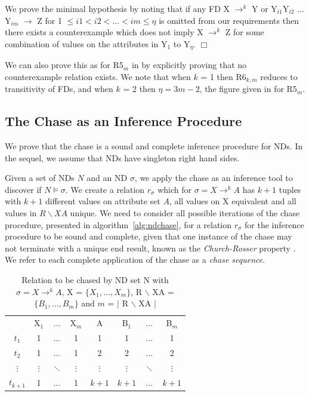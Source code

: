 We prove the minimal hypothesis by noting that if any FD X $\to^k$ Y
or \linebreak Y$_{i1}$Y$_{i2}$ $\ldots$
Y$_{im}$ $\to$ Z for 1 $\le i1 < i2 < \ldots < im \le \eta$ is
omitted from our requirements then there exists a counterexample which
does not imply X $\to^k$ Z for some combination of values on the
attributes in Y$_1$ to Y$_{\eta}$. $\Box$

\smallskip

We can also prove this as for R5$_m$ in \cite{gm85b} by explicitly
proving that no counterexample relation exists.
We note that when $k$ = 1 then R6$_{k,m}$ reduces to transitivity of FDs,
and when $k$ = 2 then $\eta = 3m - 2$, the figure given in
\cite{gm85b} for R5$_m$. 


\subsection{The Chase as an Inference Procedure}\label{subsec:nd_ch_inf}

We prove that the chase is a 
sound and complete inference procedure for NDs. In the sequel, we
assume that NDs have singleton right hand sides.

Given a set of NDs $N$ and an ND $\sigma$, we apply the chase as an
inference tool to discover if $N \models \sigma$. 
We create a relation $r_\sigma$ which for $\sigma = X \to^k
A$ has $k+1$ tuples with $k+1$ different values on attribute set $A$,
all values on X equivalent and all values in $R \backslash XA$ unique.
We need to consider all possible iterations of the chase procedure,
presented in algorithm~\ref{alg:ndchase}, for a relation $r_\sigma$
for the inference procedure to be sound and complete, given that one
instance of the chase may not terminate with a unique end result,
known as the {\em Church-Rosser} property \cite{mms79}. We refer to
each complete application of the chase as a {\em chase sequence}.

{\line
\begin{table}[ht]
\begin{center}
\begin{tabular}{c|c|c|c|c|c|c|c|} \cline{2-8}
 		& X$_1$ 	& $\ldots$ 	& X$_m$ & A 	& B$_1$ & $\ldots$ 	& B$_m$ \\ \cline{2-8}
$t_1$ 		& 1  		& $\ldots$ 	& 1	&  1  	& 1 	& $\ldots$ 	& 1 \\
$t_2$ 		& 1  	& $\ldots$ 	& 1&  2  	& 2 	&  $\ldots$ 	& 2 \\
$\vdots$ 	& $\vdots$  &  $\ddots$ & $\vdots$  &  $\vdots$  & $\vdots$ & $\ddots$ & $\vdots$ \\
$t_{k+1}$ 	& 1  &  $\ldots$  &  1  & $k+1$  & $k+1$ & $\ldots$ 	& $k+1$ \\ \cline{2-8}
\end{tabular}
\end{center}
\caption{\label{tbl:rel_chase1} Relation to be chased by ND set N with
$\sigma = X \to^k A$, X = $\{ X_1, \ldots, X_m \}$, R $\backslash$ XA = $\{ B_1, \ldots, B_m \}$
and $m$ = $|$ R $\backslash$ XA $|$}
\end{table}}	


